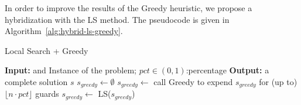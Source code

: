 \documentclass[runningheads,a4paper]{llncs}
\begin{document}
       In order to improve the results of the Greedy heuristic, we propose a hybridization with the LS method.
       The pseudocode is given in Algorithm~\ref{alg:hybrid-ls-greedy}.
        \begin{algorithm}[!t]
       	\caption{Local Search + Greedy}\label{alg:hybrid-ls-greedy}
       	\begin{algorithmic}
       		   	\State \textbf{Input:} and Instance of the problem; $pct\in (0,1)$:percentage
       		    \State \textbf{Output:} a complete solution $s$
       		    \State $s_{greedy} \gets \emptyset$
       		        \State $s_{greedy} \gets$ call Greedy to expend $s_{greedy}$ for (up to) $\lfloor n \cdot pct \rfloor$ guards
       		        \State $s_{greedy} \gets$ LS($s_{greedy}$)
       		    \EndWhile
       \end{algorithmic}
       \end{algorithm}	
\end{document}
